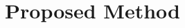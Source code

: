 \documentclass{article}
\theoremstyle{plain}
\theoremstyle{definition}
\theoremstyle{remark}
\begin{document}



\section{Proposed Method}\label{method}
\end{document}
